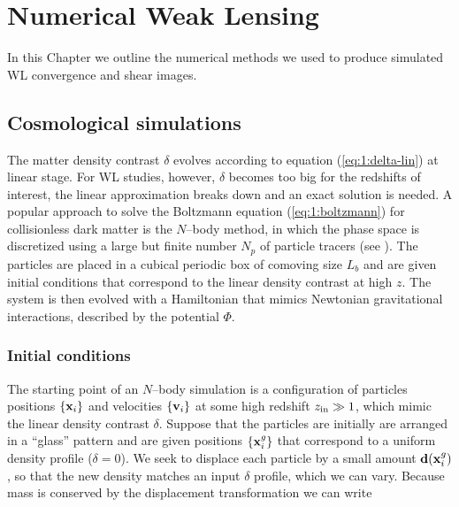 
\chapter{Numerical Weak Lensing}
\lhead[\fancyplain{}{\thepage}]{\fancyplain{}{\rightmark}}
 \thispagestyle{plain}
\setlength{\parindent}{10mm}

In this Chapter we outline the numerical methods we used to produce simulated WL convergence and shear images. 


\section{Cosmological simulations}
The matter density contrast $\delta$ evolves according to equation (\ref{eq:1:delta-lin}) at linear stage. For WL studies, however, $\delta$ becomes too big for the redshifts of interest, the linear approximation breaks down and an exact solution is needed. A popular approach to solve the Boltzmann equation (\ref{eq:1:boltzmann}) for collisionless dark matter is the $N$--body method, in which the phase space is discretized using a large but finite number $N_p$ of particle tracers (see \citep{gadget2}). The particles are placed in a cubical periodic box of comoving size $L_b$ and are given initial conditions that correspond to the linear density contrast at high $z$. The system is then evolved with a Hamiltonian that mimics Newtonian gravitational interactions, described by the potential $\Phi$.  

\subsection{Initial conditions}
The starting point of an $N$--body simulation is a configuration of particles positions $\{\mathbf{x}_i\}$ and velocities $\{\mathbf{v}_i\}$ at some high redshift $z_{\rm in}\gg 1$, which mimic the linear density contrast $\delta$. Suppose that the particles are initially are arranged in a ``glass'' pattern and are given positions $\{\mathbf{x}_i^g\}$ that correspond to a uniform density profile ($\delta=0$). We seek to displace each particle by a small amount $\mathbf{d}(\mathbf{x}_i^g)$, so that the new density matches an input $\delta$ profile, which we can vary. Because mass is conserved by the displacement transformation we can write

